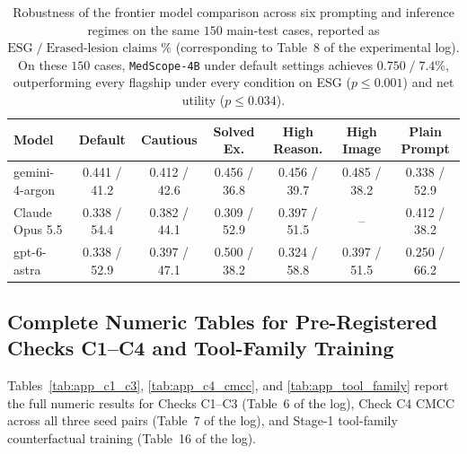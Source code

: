 \documentclass{article} %
\begin{document}
\begin{table}[h]
\caption{Robustness of the frontier model comparison across six prompting and inference regimes on the same $150$ main-test cases, reported as $\text{ESG} \;/\; \text{Erased-lesion claims \%}$ (corresponding to Table~8 of the experimental log). On these $150$ cases, \texttt{MedScope-4B} under default settings achieves $\mathbf{0.750 \;/\; 7.4\%}$, outperforming every flagship under every condition on ESG ($p \le 0.001$) and net utility ($p \le 0.034$).}
\label{tab:robustness_prompts}
\begin{center}
\small
\begin{tabular}{lcccccc}
\toprule
\textbf{Model} & \textbf{Default} & \textbf{Cautious} & \textbf{Solved Ex.} & \textbf{High Reason.} & \textbf{High Image} & \textbf{Plain Prompt} \\
\midrule
gemini-4-argon & 0.441 / 41.2 & 0.412 / 42.6 & 0.456 / 36.8 & 0.456 / 39.7 & 0.485 / 38.2 & 0.338 / 52.9 \\
Claude Opus 5.5 & 0.338 / 54.4 & 0.382 / 44.1 & 0.309 / 52.9 & 0.397 / 51.5 & -- & 0.412 / 38.2 \\
gpt-6-astra & 0.338 / 52.9 & 0.397 / 47.1 & 0.500 / 38.2 & 0.324 / 58.8 & 0.397 / 51.5 & 0.250 / 66.2 \\
\bottomrule
\end{tabular}
\end{center}
\end{table}

\subsection{Complete Numeric Tables for Pre-Registered Checks C1--C4 and Tool-Family Training}
Tables~\ref{tab:app_c1_c3}, \ref{tab:app_c4_cmcc}, and \ref{tab:app_tool_family} report the full numeric results for Checks C1--C3 (Table~6 of the log), Check C4 CMCC across all three seed pairs (Table~7 of the log), and Stage-1 tool-family counterfactual training (Table~16 of the log).
\end{document}
